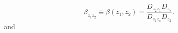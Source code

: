 \begin{equation}
\beta_{z_1z_2} \equiv \beta(z_1,z_2) = \frac{D_{z_2z_1} D_{z_s}}{D_{z_1z_s}D_{z_2}}.
\end{equation}
and